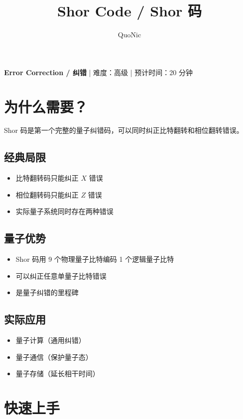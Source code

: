 \documentclass[12pt,a4paper]{article}
\title{Shor Code / Shor 码}
\author{QuoNic}
\date{}
\begin{document}
\maketitle

\begin{center}
\textbf{Error Correction / 纠错} | 难度：高级 | 预计时间：20 分钟
\end{center}

\tableofcontents
\newpage

\section{为什么需要？}

Shor 码是第一个完整的量子纠错码，可以同时纠正比特翻转和相位翻转错误。

\subsection{经典局限}
\begin{itemize}
  \item 比特翻转码只能纠正 $X$ 错误
  \item 相位翻转码只能纠正 $Z$ 错误
  \item 实际量子系统同时存在两种错误
\end{itemize}

\subsection{量子优势}
\begin{itemize}
  \item Shor 码用 9 个物理量子比特编码 1 个逻辑量子比特
  \item 可以纠正任意单量子比特错误
  \item 是量子纠错的里程碑
\end{itemize}

\subsection{实际应用}
\begin{itemize}
  \item 量子计算（通用纠错）
  \item 量子通信（保护量子态）
  \item 量子存储（延长相干时间）
\end{itemize}

\section{快速上手}
\end{document}
